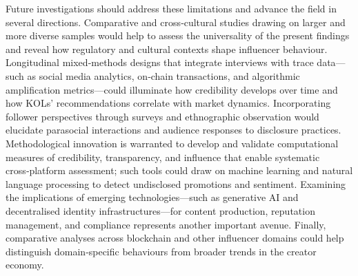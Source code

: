 Future investigations should address these limitations and advance the field in several directions.  Comparative and cross‑cultural studies drawing on larger and more diverse samples would help to assess the universality of the present findings and reveal how regulatory and cultural contexts shape influencer behaviour.  Longitudinal mixed‑methods designs that integrate interviews with trace data—such as social media analytics, on‑chain transactions, and algorithmic amplification metrics—could illuminate how credibility develops over time and how KOLs' recommendations correlate with market dynamics.  Incorporating follower perspectives through surveys and ethnographic observation would elucidate parasocial interactions and audience responses to disclosure practices.  Methodological innovation is warranted to develop and validate computational measures of credibility, transparency, and influence that enable systematic cross‑platform assessment; such tools could draw on machine learning and natural language processing to detect undisclosed promotions and sentiment.  Examining the implications of emerging technologies—such as generative AI and decentralised identity infrastructures—for content production, reputation management, and compliance represents another important avenue.  Finally, comparative analyses across blockchain and other influencer domains could help distinguish domain‑specific behaviours from broader trends in the creator economy.

